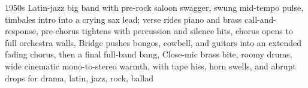 
\begin{notes}
\end{notes}
\begin{prompt}
1950s Latin-jazz big band with pre-rock saloon swagger, swung mid-tempo pulse, timbales intro into a crying sax lead; verse rides piano and brass call-and-response, pre-chorus tightens with percussion and silence hits, chorus opens to full orchestra walls, Bridge pushes bongos, cowbell, and guitars into an extended fading chorus, then a final full-band bang, Close-mic brass bite, roomy drums, wide cinematic mono-to-stereo warmth, with tape hiss, horn swells, and abrupt drops for drama, latin, jazz, rock, ballad
\end{prompt}

